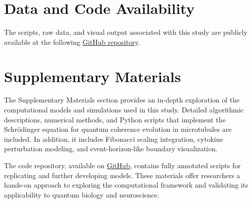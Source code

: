 \section{Data and Code Availability}
The scripts, raw data, and visual output associated with this study are publicly available at
the following \href{https://github.com/TheonlyqueenAC/Microtubule\_Simulation}{GitHub repository}.

\section{Supplementary Materials}
The Supplementary Materials section provides an in-depth exploration of the computational models and simulations used in this study. Detailed algorithmic descriptions, numerical methods, and Python scripts that implement the Schrödinger equation for quantum coherence evolution in microtubules are included. In addition, it includes Fibonacci scaling integration, cytokine perturbation modeling, and event-horizon-like boundary visualization.

The code repository, available on \href{https://github.com/TheonlyqueenAC/Microtubule_Simulation}{GitHub}, contains fully annotated scripts for replicating and further developing models. These materials offer researchers a hands-on approach to exploring the computational framework and validating its applicability to quantum biology and neuroscience.

